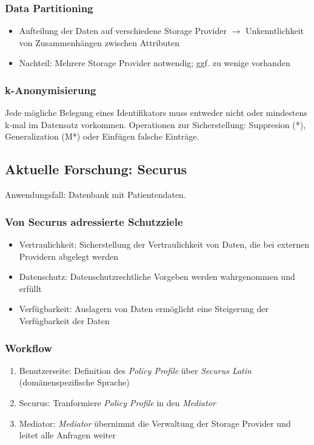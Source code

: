 \subsubsection{Data Partitioning}
\begin{itemize}
	\item Aufteilung der Daten auf verschiedene Storage Provider $\rightarrow$ Unkenntlichkeit von Zusammenhängen zwischen Attributen
	\item Nachteil: Mehrere Storage Provider notwendig; ggf. zu wenige vorhanden
\end{itemize}

\subsubsection{k-Anonymisierung}
Jede mögliche Belegung eines Identifikators muss entweder nicht oder mindestens k-mal im Datensatz vorkommen. Operationen zur Sicherstellung: Suppresion (*), Generalization (M*) oder Einfügen falsche Einträge.


\subsection{Aktuelle Forschung: Securus}
Anwendungsfall: Datenbank mit Patientendaten.

\subsubsection{Von Securus adressierte Schutzziele}
\begin{itemize}
	\item Vertraulichkeit: Sicherstellung der Vertraulichkeit von Daten, die bei externen Providern abgelegt werden
	\item Datenschutz: Datenschutzrechtliche Vorgeben werden wahrgenommen und erfüllt
	\item Verfügbarkeit: Auslagern von Daten ermöglicht eine Steigerung der Verfügbarkeit der Daten
\end{itemize}

\subsubsection{Workflow}
\begin{enumerate}
	\item Benutzerseite: Definition des \textit{Policy Profile} über \textit{Securus Latin} (domänenspezifische Sprache)
	\item Securus: Tranformiere \textit{Policy Profile} in den \textit{Mediator}
	\item Mediator: \textit{Mediator} übernimmt die Verwaltung der Storage Provider und leitet alle Anfragen weiter
\end{enumerate}

